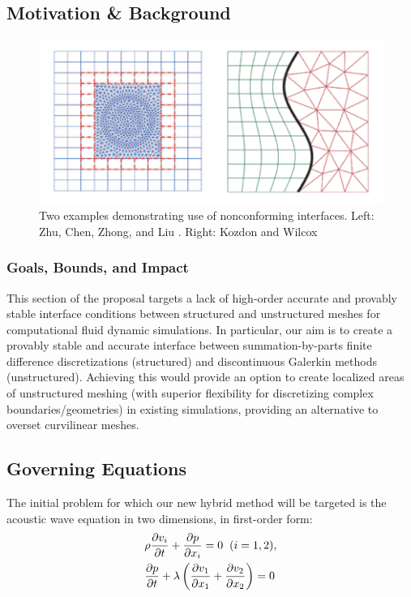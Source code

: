 \subsection{Motivation \& Background}

\begin{figure}
\centering
\includegraphics[width=0.8\linewidth,trim=4 4 4 4,clip]{figures/nonconforming_samples.png}
\caption{Two examples demonstrating use of nonconforming interfaces. Left: Zhu, Chen, Zhong, and Liu \cite{zhu2011hybrid}.
	 Right: Kozdon and Wilcox \cite{kozdon2016stable}}
\label{fig:nonconforming_samples}
\end{figure}

\subsubsection{Goals, Bounds, and Impact}

This section of the proposal targets a lack of high-order accurate and
provably stable interface conditions between structured and unstructured
meshes for computational fluid dynamic simulations. In particular, our aim
is to create a provably stable and accurate interface between summation-by-parts
finite difference discretizations (structured) and discontinuous Galerkin
methods (unstructured).  Achieving this would provide an option to create localized
areas of unstructured meshing (with superior flexibility for discretizing complex
boundaries/geometries) in existing simulations, providing an alternative to
overset curvilinear meshes.

\subsection{Governing Equations}

The initial problem for which our new hybrid method will be targeted is
the acoustic wave equation in two dimensions, in first-order form:
\begin{align}
&\rho \frac{\partial v_{i}}{\partial t} + \frac{\partial p}{\partial x_{i}} = 0 \hspace{2mm} (i = 1, 2), \\
&\frac{\partial p}{\partial t} + \lambda \left(\frac{\partial v_{1}}{\partial x_{1}} + \frac{\partial v_{2}}{\partial x_{2}} \right) = 0
\end{align}

